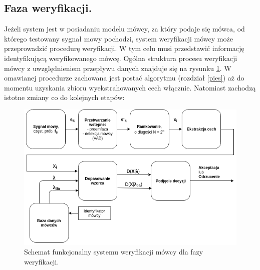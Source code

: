 \label{pies}

\subsection{Faza weryfikacji.}

Jeżeli system jest w posiadaniu modelu mówcy, za który podaje się mówca, od którego testowany sygnał mowy pochodzi, system weryfikacji mówcy może przeprowadzić procedurę weryfikacji. W tym celu musi przedstawić informację identyfikującą weryfikowanego mówcę. Ogólna struktura procesu weryfikacji mówcy z uwzględnieniem przepływu danych znajduje się na rysunku {\ref{fig:fundiagverif}}. W omawianej procedurze zachowana jest postać algorytmu (rozdział \ref{pies}) aż do momentu uzyskania zbioru wyekstrahowanych cech włącznie. Natomiast zachodzą istotne zmiany co do kolejnych etapów:

\begin{figure}[ht!]
  \centering
    \includegraphics[width=1\textwidth]{./fundiagverif.png}
    \caption{\label{fig:fundiagverif} Schemat funkcjonalny systemu weryfikacji mówcy dla fazy weryfikacji.}
\end{figure}

